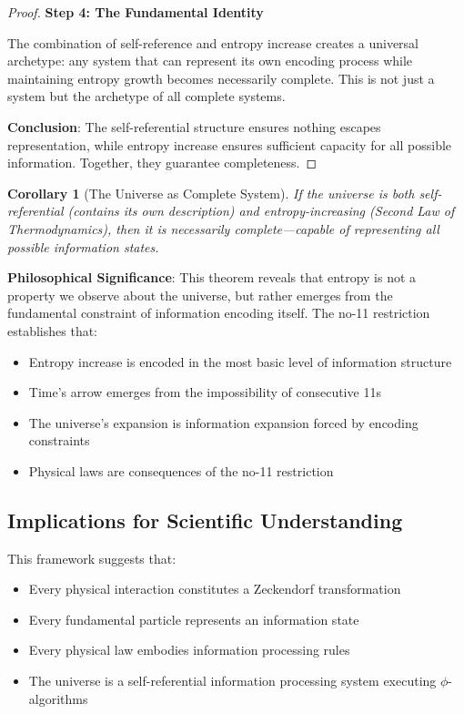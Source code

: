 \documentclass[12pt,letterpaper]{article}
\newtheorem{corollary}[theorem]{Corollary}
\begin{document}
\begin{proof}
\textbf{Step 4: The Fundamental Identity}

The combination of self-reference and entropy increase creates a universal archetype: any system that can represent its own encoding process while maintaining entropy growth becomes necessarily complete. This is not just a system but the archetype of all complete systems.

\textbf{Conclusion}: The self-referential structure ensures nothing escapes representation, while entropy increase ensures sufficient capacity for all possible information. Together, they guarantee completeness.
\end{proof}

\begin{corollary}[The Universe as Complete System]
If the universe is both self-referential (contains its own description) and entropy-increasing (Second Law of Thermodynamics), then it is necessarily complete—capable of representing all possible information states.
\end{corollary}

\textbf{Philosophical Significance}: This theorem reveals that entropy is not a property we observe about the universe, but rather emerges from the fundamental constraint of information encoding itself. The no-11 restriction establishes that:

\begin{itemize}
\item Entropy increase is encoded in the most basic level of information structure
\item Time's arrow emerges from the impossibility of consecutive 11s
\item The universe's expansion is information expansion forced by encoding constraints
\item Physical laws are consequences of the no-11 restriction
\end{itemize}

\subsection{Implications for Scientific Understanding}

This framework suggests that:

\begin{itemize}
\item Every physical interaction constitutes a Zeckendorf transformation
\item Every fundamental particle represents an information state
\item Every physical law embodies information processing rules
\item The universe is a self-referential information processing system executing $\phi$-algorithms
\end{itemize}
\end{document}
